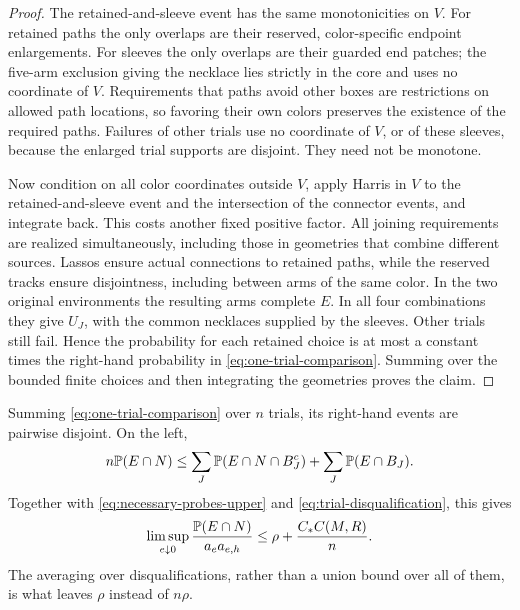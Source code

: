 \begin{proof}
The retained-and-sleeve event has the same monotonicities on $V$.
For retained paths the only overlaps are their reserved, color-specific
endpoint enlargements.  For sleeves the only overlaps are their guarded
end patches; the five-arm exclusion giving the necklace lies strictly
in the core and uses no coordinate of $V$.  Requirements that paths avoid
other boxes are restrictions on allowed path locations, so favoring their
own colors preserves the existence of the required paths.  Failures of
other trials use no coordinate of $V$, or of these sleeves, because the
enlarged trial supports are disjoint.  They need not be monotone.

Now condition on all color coordinates outside $V$, apply Harris in $V$
to the retained-and-sleeve event and the intersection of the connector
events, and integrate back.  This costs another fixed positive factor.
All joining requirements are realized simultaneously, including those
in geometries that combine different sources.  Lassos ensure actual
connections to retained paths, while the reserved tracks ensure
disjointness, including between arms of the same color.  In the two
original environments the resulting arms complete $E$.  In all four
combinations they give $U_J$, with the common necklaces supplied by the
sleeves.  Other trials still fail.  Hence the probability for each retained
choice is at most a constant times the right-hand probability in
\eqref{eq:one-trial-comparison}.  Summing over the bounded finite choices
and then integrating the geometries proves the claim.
\end{proof}

Summing \eqref{eq:one-trial-comparison} over $n$ trials, its right-hand
events are pairwise disjoint.  On the left,
\[
 n\mathbb P(E\cap N)
 \leq \sum_J\mathbb P(E\cap N\cap B_J^c)+\sum_J\mathbb P(E\cap B_J).
\]
Together with \eqref{eq:necessary-probes-upper} and
\eqref{eq:trial-disqualification}, this gives
\begin{equation}
 \limsup_{e\downarrow0}
 \frac{\mathbb P(E\cap N)}{a_ea_{e,h}}
 \leq \rho+\frac{C_* C(M,R)}{n}.
 \label{eq:many-trials}
\end{equation}
The averaging over disqualifications, rather than a union bound over all
of them, is what leaves $\rho$ instead of $n\rho$.

